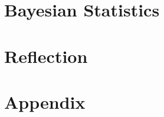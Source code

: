 \documentclass[
twoside,
openright,
titlepage,
numbers=noenddot,
headinclude,%
footinclude=true,
cleardoublepage=empty,
dottedtoc, %
BCOR=5mm,
fontsize=10pt, %
ngerman,
american, %
pagesize=pdftex,
]{scrbook}
\begin{document}
	\cleardoublepage %
	
	\part{Bayesian Statistics} %
	\label{part:bayesian}
	
	 
	
	
	
	
	
	
	
	
	
	
	
	
	\part{Reflection}
	
	
	\cleardoublepage %
	
	
	
	\appendix
	
	\part{Appendix} %
	
	
	
	
	
	
	\cleardoublepage %
	\cleardoublepage %
	
\end{document}
